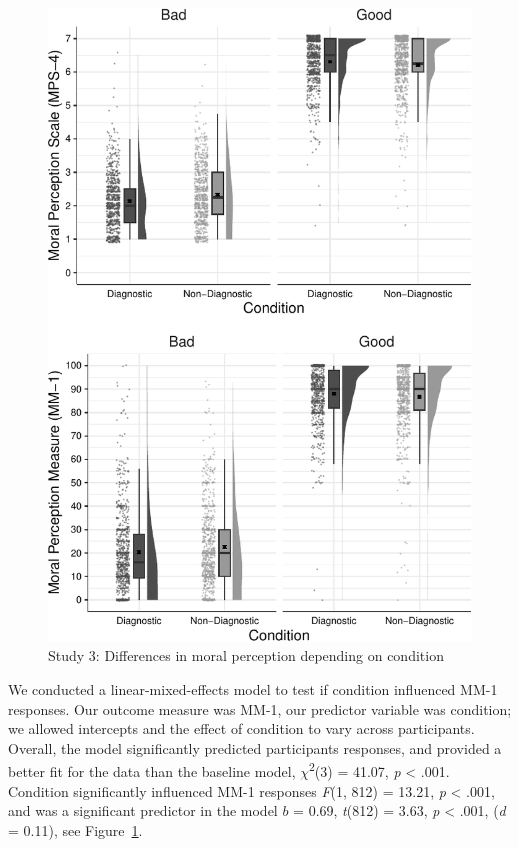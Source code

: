 \documentclass[
  man,floatsintext]{apa7}
\begin{document}
\begin{figure}
\centering
\includegraphics{moral_dilution_in_chunks_files/figure-latex/S3bothconditionplot-1.pdf}
\caption{\label{fig:S3bothconditionplot}Study 3: Differences in moral perception depending on condition}
\end{figure}

We conducted a linear-mixed-effects model to test if condition influenced MM-1 responses. Our outcome measure was MM-1, our predictor variable was condition; we allowed intercepts and the effect of condition to vary across participants. Overall, the model significantly predicted participants responses, and provided a better fit for the data than the baseline model, \(\chi\)\textsuperscript{2}(3) = 41.07, \emph{p} \textless{} .001. Condition significantly influenced MM-1 responses \emph{F}(1, 812) = 13.21, \emph{p} \textless{} .001, and was a significant predictor in the model \(b\) = 0.69, \emph{t}(812) = 3.63, \emph{p} \textless{} .001, (\emph{d} = 0.11), see Figure~\ref{fig:S3bothconditionplot}.
\end{document}
